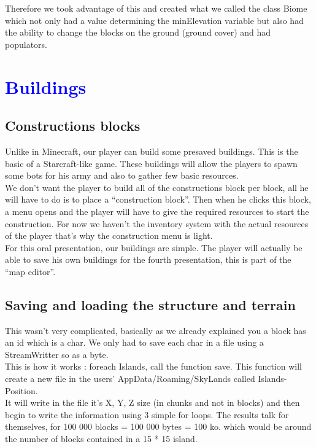 \documentclass[article]{report}             %
\begin{document}
				Therefore we took advantage of this and created what we called the class Biome which not only had a value determining the minElevation variable but also had the ability to change the blocks on the ground (ground cover) and had populators.


		\chapter{\textcolor{blue}{Buildings}}
			\section{Constructions blocks}
				Unlike in Minecraft, our player can build some presaved buildings. This is the basic of a Starcraft-like game. These buildings will allow the players to spawn some bots for his army and also to gather few basic resources.\\

We don't want the player to build all of the constructions block per block, all he will have to do is to place a \enquote{construction block}. Then when he clicks this block, a menu opens and the player will have to give the required resources to start the construction. For now we haven't the inventory system with the actual resources of the player that's why the construction menu is light.\\

For this oral presentation, our buildings are simple. The player will actually be able to save his own buildings for the fourth presentation, this is part of the \enquote{map editor}.
			
			\section{Saving and loading the structure and terrain}
				This wasn't very complicated, basically as we already explained you a block has an id which is a char. We only had to save each char in a file using a StreamWritter so as a byte.\\
				This is how it works : foreach Islands, call the function save. This function will create a new file in the users' AppData/Roaming/SkyLands called Islands-Position.\\

				It will write in the file it's X, Y, Z size (in chunks and not in blocks) and then begin to write the information using 3 simple for loops.
				The results talk for themselves, for 100 000 blocks = 100 000 bytes = 100 ko. which would be around the number of blocks contained in a 15 * 15 island.
				
\end{document}
